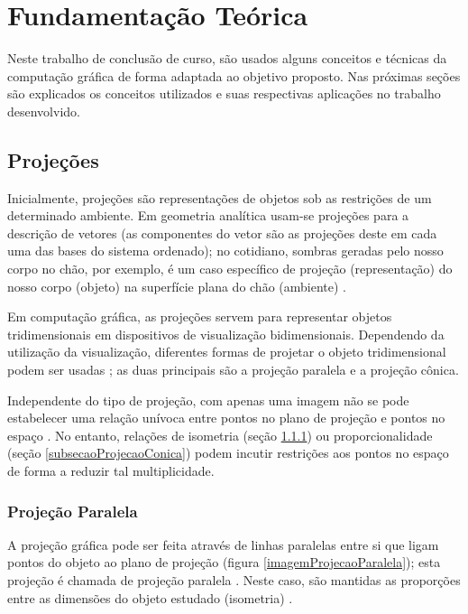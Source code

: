 \chapter{Fundamentação Teórica}
	\label{capituloReferencialTeorico}
	Neste trabalho de conclusão de curso, são usados alguns conceitos e técnicas da computação gráfica de forma adaptada ao objetivo proposto. Nas próximas seções são explicados os conceitos utilizados e suas respectivas aplicações no trabalho desenvolvido.
	
	\section{Projeções}
		\label{secaoProjecoes}
		
		Inicialmente, projeções são representações de objetos sob as restrições de um determinado ambiente. Em geometria analítica usam-se projeções para a descrição de vetores (as componentes do vetor são as projeções deste em cada uma das bases do sistema ordenado); no cotidiano, sombras geradas pelo nosso corpo no chão, por exemplo, é um caso específico de projeção (representação) do nosso corpo (objeto) na superfície plana do chão (ambiente) \cite{archiGeoBook}.
		
		Em computação gráfica, as projeções servem para representar objetos tridimensionais em dispositivos de visualização bidimensionais. Dependendo da utilização da visualização, diferentes formas de projetar o objeto tridimensional podem ser usadas \cite{archiGeoBook}; as duas principais são a projeção paralela e a projeção cônica.
		
		Independente do tipo de projeção, com apenas uma imagem não se pode estabelecer uma relação unívoca entre pontos no plano de projeção e pontos no espaço \cite{foto3D}. No entanto, relações de isometria (seção \ref{subsecaoProjecaoParalela}) ou proporcionalidade (seção \ref{subsecaoProjecaoConica}) podem incutir restrições aos pontos no espaço de forma a reduzir tal multiplicidade.
		
		\subsection{Projeção Paralela}
			\label{subsecaoProjecaoParalela}
			A projeção gráfica pode ser feita através de linhas paralelas entre si que ligam pontos do objeto ao plano de projeção (figura \ref{imagemProjecaoParalela}); esta projeção é chamada de projeção paralela \cite{archiGeoBook}. Neste caso, são mantidas as proporções entre as dimensões do objeto estudado (isometria) \cite{fundCompGraf}.
		
